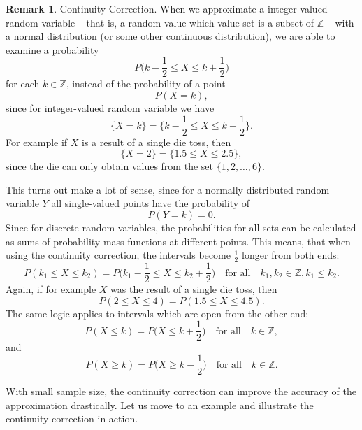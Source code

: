 \documentclass[12pt,a4paper,leqno]{report}
\newcommand{\Z}{\mathbb{Z}}
\theoremstyle{plain}
\theoremstyle{definition}
\newtheorem{remark}[equation]{Remark}
\begin{document}
\begin{remark}
Continuity Correction.  When we approximate a integer-valued random variable -- that is, a random value which value set is a subset of $\Z$ -- with a normal distribution (or some other continuous distribution), we are able to examine a probability
\[
P\Big(k - \frac{1}{2} \leq X \leq k +\frac{1}{2}\Big)
\]
for each $k \in \Z$, instead of the probability of a point
\[
P(X = k),
\]
since for integer-valued random variable we have
\[
\{X = k\} = \Big\{k - \frac{1}{2} \leq X \leq k + \frac{1}{2}\Big\}.
\]
For example if $X$ is a result of a single die toss, then
\[
\{X = 2 \} = \{1.5 \leq X \leq 2.5\}, 
\]
since the die can only obtain values from the set $\{1,2, \dots, 6\}$. 

This turns out make a lot of sense, since for a normally distributed random variable $Y$ all single-valued points have the probability of
\[
P(Y = k) = 0. 
\]
Since for discrete random variables, the probabilities for all sets can be calculated as sums of probability mass functions at different points. This means, that when using the continuity correction, the intervals become $\frac{1}{2}$ longer from both ends:
\[
P(k_1 \leq X \leq k_2) = P\Big(k_1 - \frac{1}{2} \leq X \leq k_2 + \frac{1}{2}\Big) \quad \text{for all} \quad k_1, k_2 \in \Z, k_1 \leq k_2.
\]
Again, if for example $X$ was the result of a single die toss, then 
\[
P(2 \leq X \leq 4) = P(1.5 \leq X \leq 4.5).
\]
The same logic applies to intervals which are open from the other end:
\[
P(X \leq k) = P\Big(X \leq k + \frac{1}{2}\Big) \quad \text{for all} \quad k \in \Z,
\]
and
\[
P(X \geq k) = P\Big(X \geq k - \frac{1}{2}\Big) \quad \text{for all} \quad k \in \Z.
\]

With small sample size, the continuity correction can improve the accuracy of the approximation drastically. Let us move to an example and illustrate the continuity correction in action.
\end{remark}
\end{document}
